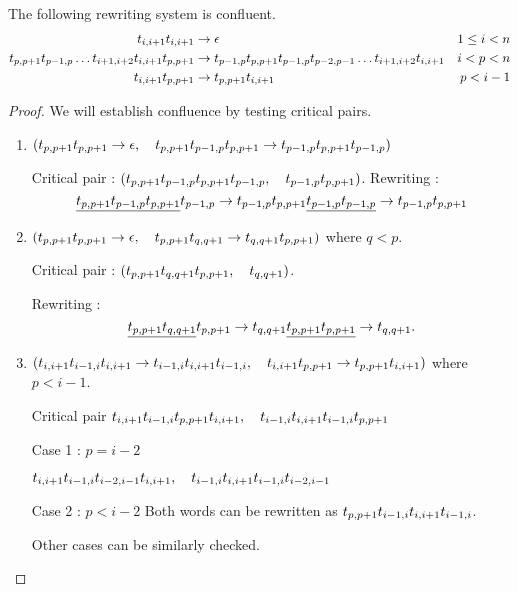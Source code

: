 \documentclass[KB-for-Reversal-Distance]{subfiles}
\begin{document}
\begin{theorem}
The following rewriting system is confluent.
\begin{align*}
t_{i, i+1}t_{i, i+1} &\rightarrow \epsilon & 1 \leq i < n \\
t_{p, p+1}t_{p-1, p} \hdots t_{i+1, i+2}t_{i, i+1} t_{p, p+1} &\rightarrow t_{p-1, p}t_{p, p+1}t_{p-1, p}t_{p-2, p-1} \hdots t_{i+1, i+2}t_{i, i+1} & i < p < n \\
t_{i, i+1}t_{p, p+1} &\rightarrow t_{p, p+1}t_{i, i+1} & p < i-1 \\
\end{align*}

\end{theorem}
\begin{proof}
We will establish confluence by testing critical pairs.
\begin{enumerate}
\item $(t_{p, p+1}t_{p, p+1} \rightarrow \epsilon, \quad t_{p, p+1}t_{p-1, p}t_{p, p+1} \rightarrow t_{p-1,p}t_{p,p+1}t_{p-1,p})$

Critical pair : $(t_{p, p+1}t_{p-1,p}t_{p,p+1}t_{p-1,p}, \quad t_{p-1, p}t_{p, p+1} )$.
Rewriting :
\[
\underline{t_{p, p+1}t_{p-1,p}t_{p,p+1}}t_{p-1,p} \rightarrow t_{p-1,p}t_{p,p+1}\underline{t_{p-1,p}t_{p-1,p}} \rightarrow t_{p-1,p}t_{p,p+1}
\]

\item $(t_{p, p+1}t_{p, p+1} \rightarrow \epsilon, \quad  t_{p, p+1}t_{q, q+1} \rightarrow t_{q, q+1}t_{p, p+1}) $ where $q < p$.

Critical pair : $(t_{p, p+1} t_{q, q+1} t_{p, p+1}, \quad t_{q, q+1})$.

Rewriting :
\[
\underline{t_{p, p+1} t_{q, q+1}} t_{p, p+1} \rightarrow t_{q, q+1}\underline{t_{p,p+1}t_{p,p+1}} \rightarrow t_{q, q+1}.
\]

\item $(t_{i,i+1}t_{i-1, i}t_{i, i+1} \rightarrow t_{i-1,i}t_{i,i+1}t_{i-1,i}, \quad t_{i, i+1}t_{p, p+1} \rightarrow t_{p, p+1}t_{i, i+1})$ where $p < i-1$.

Critical pair $t_{i,i+1}t_{i-1, i}t_{p, p+1}t_{i, i+1}, \quad t_{i-1,i}t_{i,i+1}t_{i-1,i}t_{p, p+1}$

Case 1 : $p=i-2$

$t_{i,i+1}t_{i-1, i}t_{i-2, i-1}t_{i, i+1}, \quad t_{i-1,i}t_{i,i+1}t_{i-1,i}t_{i-2, i-1}$

Case 2 : $p < i-2$
Both words can be rewritten as $t_{p, p+1}t_{i-1,i}t_{i, i+1}t_{i-1, i}$. 

Other cases can be similarly checked.
\end{enumerate}
\end{proof}
\end{document}
